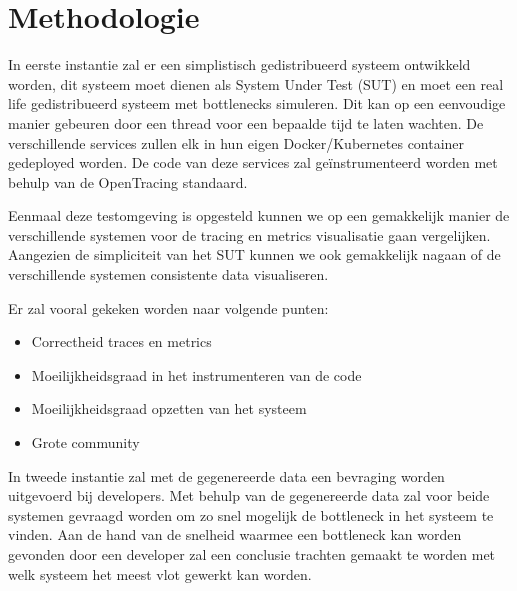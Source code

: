 
\section{Methodologie}
\label{sec:methodologie}

In eerste instantie zal er een simplistisch gedistribueerd systeem ontwikkeld worden, dit systeem moet dienen als System Under Test (SUT) en moet een real life gedistribueerd systeem met bottlenecks simuleren. Dit kan op een eenvoudige manier gebeuren door een thread voor een bepaalde tijd te laten wachten. De verschillende services zullen elk in hun eigen Docker/Kubernetes container gedeployed worden. De code van deze services zal geïnstrumenteerd worden met behulp van de OpenTracing standaard.

Eenmaal deze testomgeving is opgesteld kunnen we op een gemakkelijk manier de verschillende systemen voor de tracing en metrics visualisatie gaan vergelijken. Aangezien de simpliciteit van het SUT kunnen we ook gemakkelijk nagaan of de verschillende systemen consistente data visualiseren.

Er zal vooral gekeken worden naar volgende punten:
\begin{itemize}
	\item Correctheid traces en metrics
	\item Moeilijkheidsgraad in het instrumenteren van de code
	\item Moeilijkheidsgraad opzetten van het systeem
	\item Grote community
\end{itemize}

In tweede instantie zal met de gegenereerde data een bevraging worden uitgevoerd bij developers. Met behulp van de gegenereerde data zal voor beide systemen gevraagd worden om zo snel mogelijk de bottleneck in het systeem te vinden. Aan de hand van de snelheid waarmee een bottleneck kan worden gevonden door een developer zal een conclusie trachten gemaakt te worden met welk systeem het meest vlot gewerkt kan worden.

